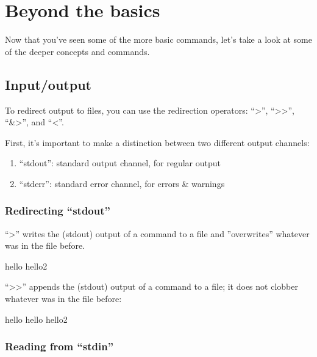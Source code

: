 \chapter{Beyond the basics}

Now that you've seen some of the more basic commands, let's take a look at some
of the deeper concepts and commands. 

\section{Input/output}

To redirect output to files, you can use the redirection operators: ``>'',
``>>'', ``&>'', and ``<''. 

First, it's important to make a distinction between two different output
channels:

\begin{enumerate}
 \item ``stdout'': standard output channel, for regular output
 \item ``stderr'': standard error channel, for errors & warnings
\end{enumerate}

\subsection{Redirecting ``stdout''}

``>'' writes the (stdout) output of a command to a file and ''overwrites''
whatever was in the file before.

\begin{prompt}
hello
hello2
\end{prompt}

``>>'' appends the (stdout) output of a command to a file; it does not clobber
whatever was in the file before:

\begin{prompt}
hello
hello
hello2
\end{prompt}

\subsection{Reading from ``stdin''}

